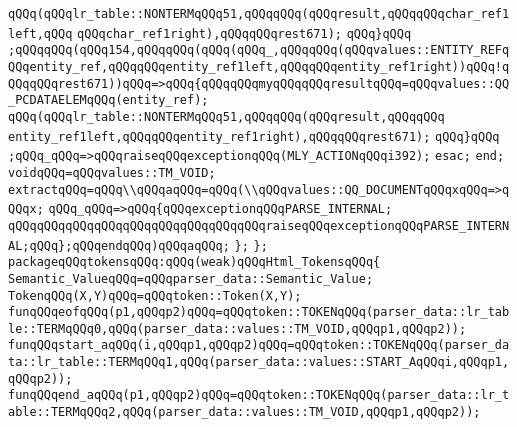 \verb|qQQq(qQQqlr_table::NONTERMqQQq51,qQQqqQQq(qQQqresult,qQQqqQQqchar_ref1left,qQQq|\newline
\verb|qQQqchar_ref1right),qQQqqQQqrest671);|\newline
\verb|qQQq}qQQq|\newline
\verb|;qQQqqQQq(qQQq154,qQQqqQQq(qQQq(qQQq_,qQQqqQQq(qQQqvalues::ENTITY_REFqQQqentity_ref,qQQqqQQqentity_ref1left,qQQqqQQqentity_ref1right))qQQq!qQQqqQQqrest671))qQQq=>qQQq{qQQqqQQqmyqQQqqQQqresultqQQq=qQQqvalues::QQ_PCDATAELEMqQQq(entity_ref);|\newline
\verb|qQQq(qQQqlr_table::NONTERMqQQq51,qQQqqQQq(qQQqresult,qQQqqQQq|\newline
\verb|entity_ref1left,qQQqqQQqentity_ref1right),qQQqqQQqrest671);|\newline
\verb|qQQq}qQQq|\newline
\verb|;qQQq_qQQq=>qQQqraiseqQQqexceptionqQQq(MLY_ACTIONqQQqi392);|\newline
\verb|esac;|\newline
\verb|end;|\newline
\verb|voidqQQq=qQQqvalues::TM_VOID;|\newline
\verb|extractqQQq=qQQq\\qQQqaqQQq=qQQq(\\qQQqvalues::QQ_DOCUMENTqQQqxqQQq=>qQQqx;|\newline
\verb|qQQq_qQQq=>qQQq{qQQqexceptionqQQqPARSE_INTERNAL;|\newline
\verb|qQQqqQQqqQQqqQQqqQQqqQQqqQQqqQQqqQQqraiseqQQqexceptionqQQqPARSE_INTERNAL;qQQq};qQQqendqQQq)qQQqaqQQq;|\newline
\verb|};|\newline
\verb|};|\newline
\verb|packageqQQqtokensqQQq:qQQq(weak)qQQqHtml_TokensqQQq{|\newline
\verb|Semantic_ValueqQQq=qQQqparser_data::Semantic_Value;|\newline
\verb|TokenqQQq(X,Y)qQQq=qQQqtoken::Token(X,Y);|\newline
\verb|funqQQqeofqQQq(p1,qQQqp2)qQQq=qQQqtoken::TOKENqQQq(parser_data::lr_table::TERMqQQq0,qQQq(parser_data::values::TM_VOID,qQQqp1,qQQqp2));|\newline
\verb|funqQQqstart_aqQQq(i,qQQqp1,qQQqp2)qQQq=qQQqtoken::TOKENqQQq(parser_data::lr_table::TERMqQQq1,qQQq(parser_data::values::START_AqQQqi,qQQqp1,qQQqp2));|\newline
\verb|funqQQqend_aqQQq(p1,qQQqp2)qQQq=qQQqtoken::TOKENqQQq(parser_data::lr_table::TERMqQQq2,qQQq(parser_data::values::TM_VOID,qQQqp1,qQQqp2));|\newline
